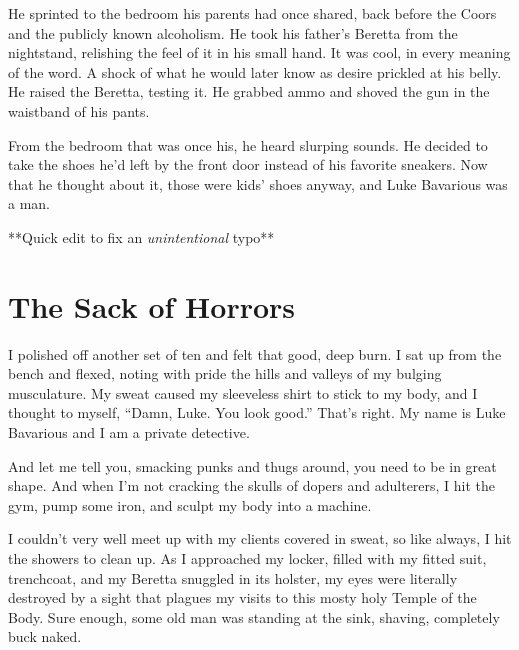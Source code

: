 He sprinted to the bedroom his parents had once shared, back before
the Coors and the publicly known alcoholism. He took his
father's Beretta from the nightstand, relishing the feel of
it in his small hand. It was cool, in every meaning of the word. A
shock of what he would later know as desire prickled at his belly.
He raised the Beretta, testing it. He grabbed ammo and shoved the
gun in the waistband of his pants.



From the bedroom that was once his, he heard slurping sounds. He
decided to take the shoes he'd left by the front door instead
of his favorite sneakers. Now that he thought about it, those were
kids' shoes anyway, and Luke Bavarious was a man.



**Quick edit to fix an {\em unintentional} typo** 

 





\chapter{The Sack of Horrors}



I polished off another set of ten and felt that good, deep burn. I
sat up from the bench and flexed, noting with pride the hills and
valleys of my bulging musculature. My sweat caused my sleeveless
shirt to stick to my body, and I thought to myself, ``Damn, Luke.
You look good.'' That's right. My name is Luke Bavarious and I am a
private detective.



And let me tell you, smacking punks and thugs around, you need to
be in great shape. And when I'm not cracking the skulls of dopers
and adulterers, I hit the gym, pump some iron, and sculpt my body
into a machine.



I couldn't very well meet up with my clients covered in sweat, so
like always, I hit the showers to clean up. As I approached my
locker, filled with my fitted suit, trenchcoat, and my Beretta
snuggled in its holster, my eyes were literally destroyed by a
sight that plagues my visits to this mosty holy Temple of the Body.
Sure enough, some old man was standing at the sink, shaving,
completely buck naked.



